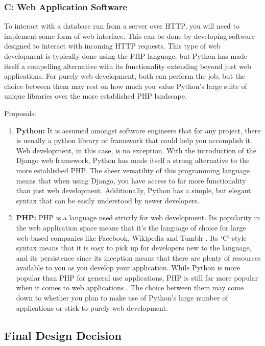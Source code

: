 \subsubsection{C: Web Application Software}

To interact with a database run from a server over HTTP, you will need to implement some form of web interface. This can be done by developing software designed to interact with incoming HTTP requests. This type of web development is typically done using the PHP language, but Python has made itself a compelling alternative with its functionality extending beyond just web applications. For purely web development, both can perform the job, but the choice between them may rest on how much you value Python's large suite of unique libraries over the more established PHP landscape.

Proposals:

\begin{enumerate}
    \item \textbf{Python:} It is assumed amongst software engineers that for any project, there is usually a python library or framework that could help you accomplish it. Web development, in this case, is no exception. With the introduction of the Django web framework, Python has made itself a strong alternative to the more established PHP. The sheer versatility of this programming language means that when using Django, you have access to far more functionality than just web development. Additionally, Python has a simple, but elegant syntax that can be easily understood by newer developers. 
    \item \textbf{PHP:} PHP is a language used strictly for web development. Its popularity in the web application space means that it's the language of choice for large web-based companies like Facebook, Wikipedia and Tumblr \cite{ThePHPGroup}. Its `C'-style syntax means that it is easy to pick up for developers new to the language, and its persistence since its inception means that there are plenty of resources available to you as you develop your application. While Python is more popular than PHP for general use applications, PHP is still far more popular when it comes to web applications \cite{ThePHPGroup}. The choice between them may come down to whether you plan to make use of Python's large number of applications or stick to purely web development.
\end{enumerate}

\subsection{Final Design Decision}

